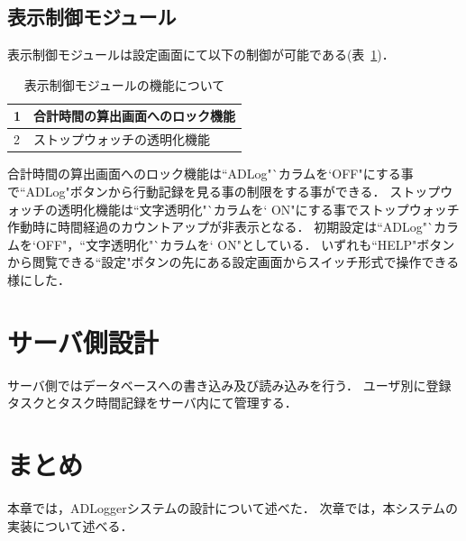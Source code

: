 \subsection{表示制御モジュール}
表示制御モジュールは設定画面にて以下の制御が可能である(表~\ref{tb:hyoji})．
\begin{table}[htb]
\begin{center}
  \begin{tabular}{|l|l|} \hline
   1 & 合計時間の算出画面へのロック機能 \\ \hline
   2 & ストップウォッチの透明化機能 \\ \hline
  \end{tabular}
  \caption{表示制御モジュールの機能について}
  \label{tb:hyoji}
\end{center}
\end{table}
合計時間の算出画面へのロック機能は``ADLog"`カラムを`OFF"にする事で``ADLog"ボタンから行動記録を見る事の制限をする事ができる．
ストップウォッチの透明化機能は``文字透明化"`カラムを` ON"にする事でストップウォッチ作動時に時間経過のカウントアップが非表示となる．
初期設定は``ADLog"`カラムを`OFF"，``文字透明化"`カラムを` ON"としている．
いずれも``HELP"ボタンから閲覧できる``設定"ボタンの先にある設定画面からスイッチ形式で操作できる様にした．


\section{サーバ側設計}
サーバ側ではデータベースへの書き込み及び読み込みを行う．
ユーザ別に登録タスクとタスク時間記録をサーバ内にて管理する．

\section{まとめ}
本章では，ADLoggerシステムの設計について述べた．
次章では，本システムの実装について述べる．
